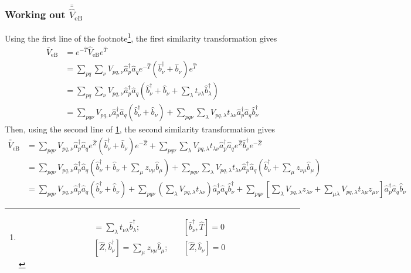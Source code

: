 \subsubsection{Working out $\bar{\bar{\hat{V}}}_{\mathrm{eB}}$}
Using the first line of the footnote\footnote{\label{foot:commutators}
	\begin{align}
	[\hat{b}_\nu, \hat{T}] = \sum_\lambda t_{\nu \lambda} \hat{b}^\dagger_\lambda; &\quad [\hat{b}^\dagger_\nu, \hat{T}] = 0 \\
	[\hat{Z}, \hat{b}^\dagger_\nu] = \sum_\mu z_{\nu\mu} \hat{b}_\mu; &\quad [\hat{Z}, \hat{b}_\nu] = 0
	\end{align}},
the first similarity transformation gives
\begin{equation}
\begin{split}	
	\bar{V}_{\mathrm{eB}} 
	& = e^{-\hat{T}} \hat{V}_{\mathrm{eB}} e^{\hat{T}} \\
	& = \sum_{pq} \sum_{\nu} V_{pq,\nu} \hat{a}^\dagger_p \hat{a}_q e^{-\hat{T}} \left(\hat{b}^\dagger_{\nu} + \hat{b}_{\nu}\right) e^{\hat{T}} \\
& = \sum_{pq} \sum_{\nu} V_{pq,\nu} \hat{a}^\dagger_p \hat{a}_q \left(\hat{b}^\dagger_{\nu} + \hat{b}_{\nu} + \sum_\lambda t_{\nu \lambda} \hat{b}^\dagger_\lambda\right) \\
& = \sum_{pq\nu} V_{pq,\nu} \hat{a}^\dagger_p \hat{a}_q \left(\hat{b}^\dagger_{\nu} + \hat{b}_{\nu}\right) + \sum_{pq\nu} \sum_\lambda V_{pq,\lambda} t_{\lambda \nu} \hat{a}^\dagger_p \hat{a}_q \hat{b}^\dagger_{\nu}
\end{split}
\end{equation}
Then, using the second line of \ref{foot:commutators}, 
 the second similarity transformation gives
\begin{align}
	\bar{\bar{V}}_{\mathrm{eB}} 
	& = \sum_{pq\nu} V_{pq,\nu} \hat{a}^\dagger_p \hat{a}_q e^{\hat{Z}} \left(\hat{b}^\dagger_{\nu} + \hat{b}_{\nu}\right) e^{-\hat{Z}} + \sum_{pq\nu} \sum_\lambda V_{pq,\lambda} t_{\lambda \nu} \hat{a}^\dagger_p \hat{a}_q e^{\hat{Z}} \hat{b}^\dagger_{\nu} e^{-\hat{Z}} \\
	& = \sum_{pq\nu} V_{pq,\nu} \hat{a}^\dagger_p \hat{a}_q \left(\hat{b}^\dagger_{\nu} + \hat{b}_{\nu} + \sum_\mu z_{\nu\mu} \hat{b}_\mu\right) + \sum_{pq\nu} \sum_\lambda V_{pq,\lambda} t_{\lambda \nu} \hat{a}^\dagger_p \hat{a}_q \left(\hat{b}^\dagger_{\nu} + \sum_\mu z_{\nu\mu} \hat{b}_\mu\right) \\ 
	& = \sum_{pq\nu} V_{pq,\nu} \hat{a}^\dagger_p \hat{a}_q (\hat{b}^\dagger_{\nu} + \hat{b}_{\nu}) + \sum_{pq\nu} \left( \sum_\lambda V_{pq,\lambda} t_{\lambda \nu} \right) \hat{a}^\dagger_p \hat{a}_q \hat{b}^\dagger_{\nu} + \sum_{pq\nu} \left[ \sum_\lambda V_{pq,\lambda} z_{\lambda \nu}  + \sum_{\mu \lambda}  V_{pq,\lambda} t_{\lambda \mu} z_{\mu \nu} \right] \hat{a}^\dagger_p \hat{a}_q \hat{b}_{\nu}
\end{align}
